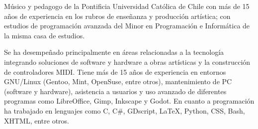 

\begin{cvparagraph}

Músico y pedagogo de la Pontificia Universidad Católica de Chile con más de 15
años de experiencia en los rubros de enseñanza y producción artística; con
estudios de programación avanzada del Minor en Programación e Informática de la
misma casa de estudios.

Se ha desempeñado principalmente en áreas relacionadas a la tecnología
integrando soluciones de software y hardware a obras artísticas y la
construcción de controladores MIDI. Tiene más de 15 años de experiencia en
entornos GNU/Linux (Gentoo, Mint, OpenSuse, entre otros), mantenimiento de PC
(software y hardware), asistencia a usuarios y uso avanzado de diferentes
programas como LibreOffice, Gimp, Inkscape y Godot. En cuanto a programación ha
trabajado en lenguajes como C, C\#, GDscript, LaTeX, Python, CSS, Bash, XHTML,
entre otros.

\end{cvparagraph}

